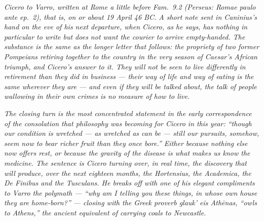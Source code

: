 
\textit{Cicero to Varro, written at Rome a little before
\textit{Fam.}~9.2 (Perseus: \textit{Romae paulo ante ep.~2}),
that is, on or about 19 April 46 BC. A short note sent in
Caninius's hand on the eve of his next departure, when Cicero,
as he says, has nothing in particular to write but does not want
the courier to arrive empty-handed. The substance is the same as
the longer letter that follows: the propriety of two former
Pompeians retiring together to the country in the very season of
Caesar's African triumph, and Cicero's answer to it. They will
not be seen to live differently in retirement than they did in
business --- their way of life and way of eating is the same
wherever they are --- and even if they will be talked about, the
talk of people wallowing in their own crimes is no measure of
how to live.}

\textit{The closing turn is the most concentrated statement in
the early correspondence of the consolation that philosophy was
becoming for Cicero in this year: ``though our condition is
wretched --- as wretched as can be --- still our pursuits,
somehow, seem now to bear richer fruit than they once bore.''
Either because nothing else now offers rest, or because the
gravity of the disease is what makes us know the medicine. The
sentence is Cicero turning over, in real time, the discovery
that will produce, over the next eighteen months, the
\textit{Hortensius}, the \textit{Academica}, the \textit{De
Finibus} and the \textit{Tusculans}. He breaks off with one of
his elegant compliments to Varro the polymath --- ``why am I
telling you these things, in whose own house they are
home-born?'' --- closing with the Greek proverb \textit{glauk'
eis Athēnas}, ``owls to Athens,'' the ancient equivalent of
carrying coals to Newcastle.}
